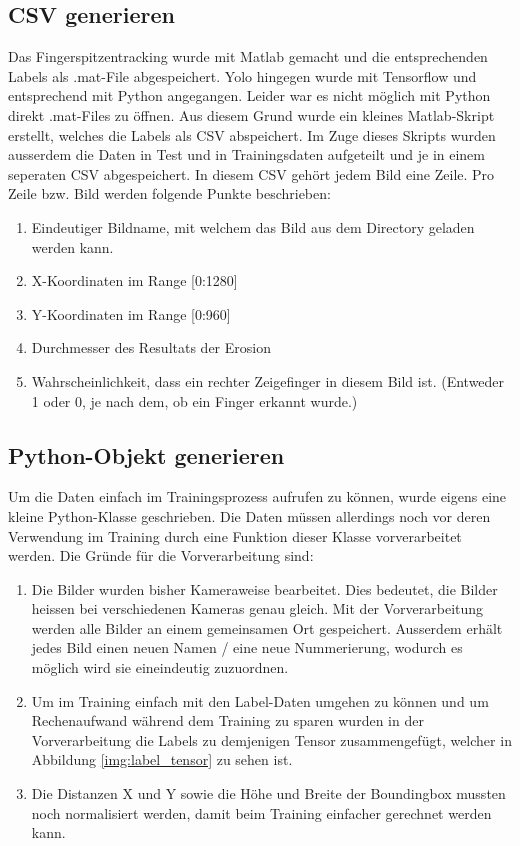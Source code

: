 \subsection{CSV generieren}
Das Fingerspitzentracking wurde mit Matlab gemacht und die entsprechenden Labels als .mat-File abgespeichert.
Yolo hingegen wurde mit Tensorflow und entsprechend mit Python angegangen. 
Leider war es nicht möglich mit Python direkt .mat-Files zu öffnen. 
Aus diesem Grund wurde ein kleines Matlab-Skript erstellt, welches die Labels als CSV abspeichert. 
Im Zuge dieses Skripts wurden ausserdem die Daten in Test und in Trainingsdaten aufgeteilt und je in einem seperaten CSV abgespeichert.
In diesem CSV gehört jedem Bild eine Zeile. 
Pro Zeile bzw. Bild werden folgende Punkte beschrieben:
\begin{enumerate}
\item Eindeutiger Bildname, mit welchem das Bild aus dem Directory geladen werden kann. 
\item X-Koordinaten im Range [0:1280]
\item Y-Koordinaten im Range [0:960]
\item Durchmesser des Resultats der Erosion
\item Wahrscheinlichkeit, dass ein rechter Zeigefinger in diesem Bild ist. 
(Entweder 1 oder 0, je nach dem, ob ein Finger erkannt wurde.)
\end{enumerate}


\subsection{Python-Objekt generieren}
Um die Daten einfach im Trainingsprozess aufrufen zu können, wurde eigens eine kleine Python-Klasse geschrieben.
Die Daten müssen allerdings noch vor deren Verwendung im Training durch eine Funktion dieser Klasse vorverarbeitet werden.
Die Gründe für die Vorverarbeitung sind: 
\begin{enumerate}
\item Die Bilder wurden bisher Kameraweise bearbeitet.
Dies bedeutet, die Bilder heissen bei verschiedenen Kameras genau gleich.
Mit der Vorverarbeitung werden alle Bilder an einem gemeinsamen Ort gespeichert.
Ausserdem erhält jedes Bild einen neuen Namen / eine neue Nummerierung, wodurch es möglich wird sie eineindeutig zuzuordnen. 
\item Um im Training einfach mit den Label-Daten umgehen zu können und um Rechenaufwand während dem Training zu sparen wurden in der Vorverarbeitung die Labels zu demjenigen Tensor zusammengefügt, welcher in Abbildung \ref{img:label_tensor} zu sehen ist.
\item Die Distanzen X und Y sowie die Höhe und Breite der Boundingbox mussten noch normalisiert werden, damit beim Training einfacher gerechnet werden kann.
\end{enumerate}
